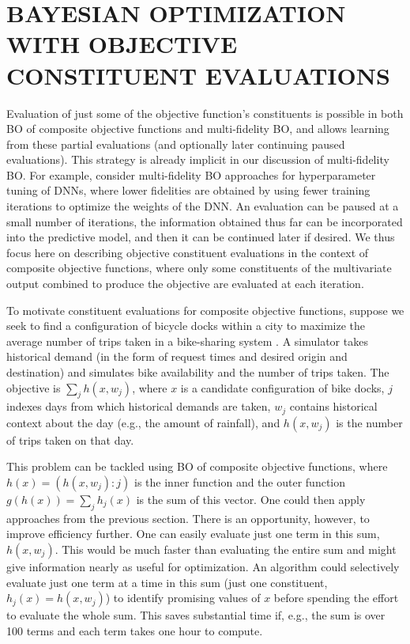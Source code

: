 \documentclass{wscpaperproc}
\theoremstyle{wsc}
\begin{document}
\section{BAYESIAN OPTIMIZATION WITH OBJECTIVE CONSTITUENT EVALUATIONS}
\label{sec:constituent-BO}
Evaluation of just some of the objective function's constituents is possible in both BO of composite objective functions and multi-fidelity BO, and allows learning from these partial evaluations (and optionally later continuing paused evaluations). This strategy is already implicit in our discussion of multi-fidelity BO. For example, consider  
multi-fidelity BO approaches for hyperparameter tuning of DNNs, where lower fidelities are obtained by using fewer training iterations to optimize the weights of the DNN. An evaluation can be paused at a small number of iterations, the information obtained thus far can be incorporated into the predictive model, and then it can be continued later if desired. We thus focus here on describing objective constituent evaluations in the context of composite objective functions, where only some constituents of the multivariate output combined to produce the objective are evaluated at each iteration.

To motivate constituent evaluations for composite objective functions,
suppose we seek to find a configuration of bicycle docks within a city to maximize the average number of trips taken in a bike-sharing system . A simulator takes historical demand (in the form of request times and desired origin and destination) and simulates bike availability and the number of trips taken. The objective is $\sum_j h(x,w_j)$, where $x$ is a candidate configuration of bike docks, $j$ indexes days from which historical demands are taken, $w_j$ contains historical context about the day (e.g., the amount of rainfall), and $h(x,w_j)$ is the number of trips taken on that day. 

This problem can be tackled using BO of composite objective functions, where $h(x) = (h(x,w_j) : j)$ is the inner function and the outer function $g(h(x)) = \sum_j h_j(x)$ is the sum of this vector. One could then apply approaches from  the previous section. There is an opportunity, however, to improve efficiency further. One can easily evaluate just one term in this sum, $h(x,w_j)$. This would be much faster than evaluating the entire sum and might give information nearly as useful for optimization. 
An algorithm could selectively evaluate just one term at a time in this sum (just one constituent, $h_j(x) = h(x,w_j)$) to identify promising values of $x$ before spending the effort to evaluate the whole sum. This saves substantial time if, e.g., the sum is over 100 terms and each term takes one hour to compute.
\end{document}
